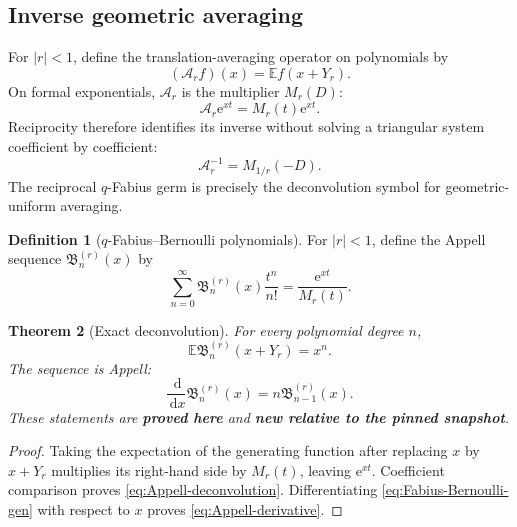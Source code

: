 \documentclass[11pt,oneside]{article}
\numberwithin{equation}{section}
\newtheorem{theorem}{Theorem}[section]
\theoremstyle{definition}
\newtheorem{definition}[theorem]{Definition}
\theoremstyle{remark}
\newcommand{\E}{\mathbb E}
\newcommand{\dd}{\,\mathrm d}
\newcommand{\e}{\mathrm e}
\newcommand{\proved}{\textcolor{deepgreen}{\textbf{proved here}}}
\newcommand{\auditnew}{\textcolor{deepviolet}{\textbf{new relative to the pinned snapshot}}}
\newcommand{\Br}{\mathfrak B}
\begin{document}
\subsection{Inverse geometric averaging}

For $|r|<1$, define the translation-averaging operator on polynomials by
\begin{equation}
 (\mathcal A_r f)(x)=\E f(x+Y_r).
 \label{eq:averaging-operator}
\end{equation}
On formal exponentials, $\mathcal A_r$ is the multiplier $M_r(D)$:
\[
 \mathcal A_r\e^{xt}=M_r(t)\e^{xt}.
\]
Reciprocity therefore identifies its inverse without solving a triangular
system coefficient by coefficient:
\begin{equation}
 \boxed{
 \mathcal A_r^{-1}=M_{1/r}(-D).}
 \label{eq:averaging-inverse}
\end{equation}
The reciprocal $q$-Fabius germ is precisely the deconvolution symbol for
geometric-uniform averaging.

\begin{definition}[$q$-Fabius--Bernoulli polynomials]
For $|r|<1$, define the Appell sequence $\Br_n^{(r)}(x)$ by
\begin{equation}
 \boxed{
 \sum_{n=0}^{\infty}\Br_n^{(r)}(x)\frac{t^n}{n!}
 =\frac{\e^{xt}}{M_r(t)}.}
 \label{eq:Fabius-Bernoulli-gen}
\end{equation}
\end{definition}

\begin{theorem}[Exact deconvolution]
\label{thm:Appell-deconvolution}
For every polynomial degree $n$,
\begin{equation}
 \boxed{
 \E\Br_n^{(r)}(x+Y_r)=x^n.}
 \label{eq:Appell-deconvolution}
\end{equation}
The sequence is Appell:
\begin{equation}
 \frac{\dd}{\dd x}\Br_n^{(r)}(x)=n\Br_{n-1}^{(r)}(x).
 \label{eq:Appell-derivative}
\end{equation}
These statements are \proved{} and \auditnew.
\end{theorem}

\begin{proof}
Taking the expectation of the generating function after replacing $x$ by
$x+Y_r$ multiplies its right-hand side by $M_r(t)$, leaving $\e^{xt}$.
Coefficient comparison proves \eqref{eq:Appell-deconvolution}.  Differentiating
\eqref{eq:Fabius-Bernoulli-gen} with respect to $x$ proves
\eqref{eq:Appell-derivative}.
\end{proof}
\end{document}
